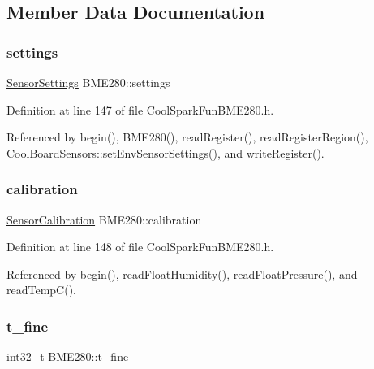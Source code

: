 \subsection{Member Data Documentation}
\mbox{\label{class_b_m_e280_af06253eb2f8ad4b5fabb858bc4a973bf}} 
\subsubsection{\texorpdfstring{settings}{settings}}
{\footnotesize\ttfamily \hyperlink{_cool_spark_fun_b_m_e280_8h_d8/dd4/struct_sensor_settings}{Sensor\+Settings} B\+M\+E280\+::settings}



Definition at line 147 of file Cool\+Spark\+Fun\+B\+M\+E280.\+h.



Referenced by begin(), B\+M\+E280(), read\+Register(), read\+Register\+Region(), Cool\+Board\+Sensors\+::set\+Env\+Sensor\+Settings(), and write\+Register().

\mbox{\label{class_b_m_e280_aa7a28484b6f5eb6f43261ea25016fbf8}} 
\subsubsection{\texorpdfstring{calibration}{calibration}}
{\footnotesize\ttfamily \hyperlink{_cool_spark_fun_b_m_e280_8h_d0/d9c/struct_sensor_calibration}{Sensor\+Calibration} B\+M\+E280\+::calibration}



Definition at line 148 of file Cool\+Spark\+Fun\+B\+M\+E280.\+h.



Referenced by begin(), read\+Float\+Humidity(), read\+Float\+Pressure(), and read\+Temp\+C().

\mbox{\label{class_b_m_e280_ad20f44914b78395f4d4bc64f4a68b369}} 
\subsubsection{\texorpdfstring{t\+\_\+fine}{t\_fine}}
{\footnotesize\ttfamily int32\+\_\+t B\+M\+E280\+::t\+\_\+fine}



